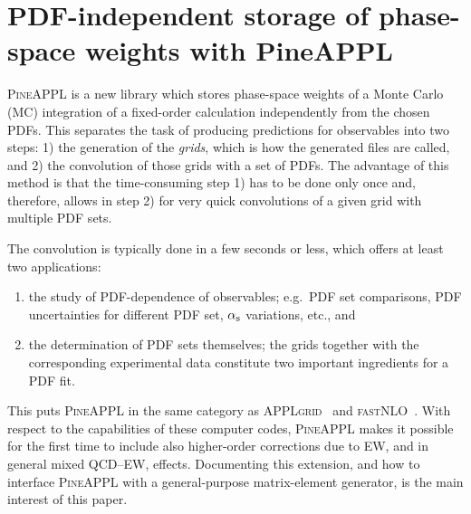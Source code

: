 \section{PDF-independent storage of phase-space weights with PineAPPL}
\label{sec:pineappl}

\textsc{PineAPPL} is a new library which stores phase-space weights of a Monte Carlo (MC) integration of a fixed-order calculation independently from the chosen PDFs.
This separates the task of producing predictions for observables into two steps: 1) the generation of the \emph{grids}, which is how the generated files are called, and 2) the convolution of those grids with a set of PDFs.
The advantage of this method is that the time-consuming step 1) has to be done only once and, therefore, allows in step 2) for very quick convolutions of a given grid with multiple PDF sets.

The convolution is typically done in a few seconds or less, which offers at least two applications:
\begin{enumerate}
\item the study of PDF-dependence of observables; e.g.\ PDF set comparisons, PDF uncertainties for different PDF set, $\alpha_\mathrm{s}$ variations, etc., and
\item the determination of PDF sets themselves; the grids together with the corresponding experimental data constitute two important ingredients for a PDF fit.
\end{enumerate}
This puts \textsc{PineAPPL} in the same category as \textsc{APPLgrid}~\cite{Carli:2010rw} and \textsc{fastNLO}~\cite{Kluge:2006xs,Wobisch:2011ij,Britzger:2012bs}.
With respect to the capabilities of these computer codes, \textsc{PineAPPL} makes it possible for the first time to include also higher-order corrections due to EW, and in general mixed QCD--EW, effects.
Documenting this extension, and how to interface \textsc{PineAPPL} with a general-purpose matrix-element generator, is the main interest of this paper.

